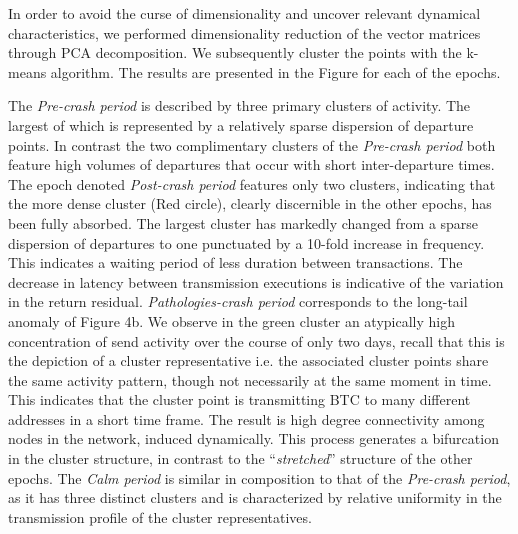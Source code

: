 In order to avoid the curse of dimensionality and uncover relevant dynamical characteristics, we performed dimensionality reduction of the vector matrices through PCA decomposition. 
We subsequently cluster the points with the k-means algorithm. 
The results are presented in the Figure for each of the epochs.




The \textit{Pre-crash period} is described by three primary clusters of activity.
The largest of which is represented by a relatively sparse dispersion of departure points.
In contrast the two complimentary clusters of the \textit{Pre-crash period} both feature high volumes of departures that occur with short inter-departure times.
The epoch denoted \textit{Post-crash period} features only two clusters, indicating that the more dense cluster (Red circle), clearly discernible in the other epochs, has been fully absorbed. 
The largest cluster has markedly changed from a sparse dispersion of departures to one punctuated by a 10-fold increase in frequency.
This indicates a waiting period of less duration between transactions.
The decrease in latency between transmission executions is indicative of the variation in the return residual. 
\textit{Pathologies-crash period} corresponds to the long-tail anomaly of Figure 4b. 
We observe in the green cluster an atypically high concentration of send activity over the course of only two days, recall that this is the depiction of a cluster representative i.e. the associated cluster points share the same activity pattern, though not necessarily at the same moment in time. 
This indicates that the cluster point is transmitting BTC to many different addresses in a short time frame. 
The result is high degree connectivity among nodes in the network, induced dynamically. 
This process generates a bifurcation in the cluster structure, in contrast to the ``\textit{stretched}'' structure of the other epochs. 
The \textit{Calm period} is similar in composition to that of the \textit{Pre-crash period}, as it has three distinct clusters and is characterized by relative uniformity in the transmission profile of the cluster representatives.

